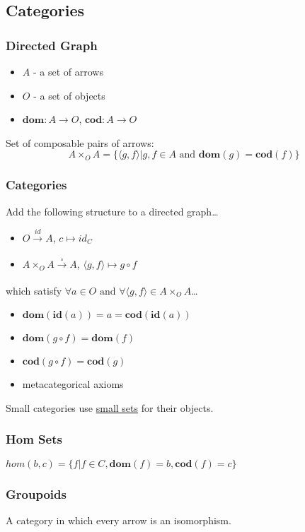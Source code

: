 \subsection{Categories}\label{category}

\subsubsection{Directed Graph}\label{directedgraph}
\begin{itemize}
  \item $A$ - a set of arrows
  \item $O$ - a set of objects
  \item $\textbf{dom}: A \rightarrow O$, $\textbf{cod}: A \rightarrow O$
\end{itemize}

Set of composable pairs of arrows: $$A \times_O A = \{ \langle g, f \rangle | g, f \in A \textrm{ and } \textbf{dom} (g) = \textbf{cod} (f) \}$$

\subsubsection{Categories}\label{categorydefinition}
Add the following structure to a directed graph\dots
\begin{itemize}
  \item $O \xrightarrow[]{id} A$, $c \mapsto id_C$
  \item $A \times_O A \xrightarrow[]{\circ} A$, $\langle g, f \rangle \mapsto g \circ f$
\end{itemize}
which satisfy $\forall a \in O \textrm{ and } \forall \langle g, f \rangle \in A \times_O A$\dots
\begin{itemize}
  \item $\textbf{dom}(\textbf{id}(a)) = a = \textbf{cod}(\textbf{id}(a))$
  \item $\textbf{dom}(g \circ f) = \textbf{dom}(f)$
  \item $\textbf{cod}(g \circ f) = \textbf{cod}(g)$
  \item metacategorical axioms
\end{itemize}

Small categories use \hyperref[smallsets]{small sets} for their objects. \label{smallcategories}

\subsubsection{Hom Sets}\label{homset}
$hom(b,c) = \{f | f \in C, \textbf{dom}(f) = b, \textbf{cod}(f) = c \}$

\subsubsection{Groupoids}\label{groupoid}
A category in which every arrow is an isomorphism.
